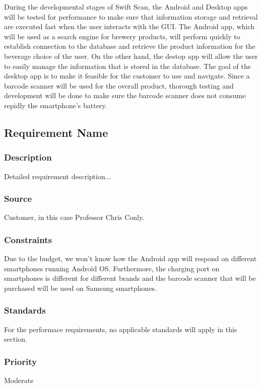 During the developmental stages of Swift Scan, the Android and Desktop apps will be tested for performance to make sure that information storage and retrieval are executed fast when the user interacts with the GUI.  The Android app, which will be used as a search engine for brewery products, will perform quickly to establish connection to the database and retrieve the product information for the beverage choice of the user.  On the other hand, the destop app will allow the user to easily manage the information that is stored in the database.  The goal of the desktop app is to make it feasible for the customer to use and navigate.  Since a barcode scanner will be used for the overall product, thorough testing and development will be done to make sure the barcode scanner does not consume repidly the smartphone's battery.

\subsection{Requirement Name}
\subsubsection{Description}
Detailed requirement description...
\subsubsection{Source}
Customer, in this case Professor Chris Conly.
\subsubsection{Constraints}
Due to the budget, we won't know how the Android app will respond on different smartphones running Android OS.  Furthermore, the charging port on smartphones is different for different brands and the barcode scanner that will be purchased will be used on Samsung smartphones.
\subsubsection{Standards}
For the performace requirements, no applicable standards will apply in this section.
\subsubsection{Priority}
Moderate
